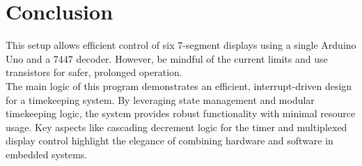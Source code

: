 \documentclass[journal]{IEEEtran}
\begin{document}
\section{Conclusion}
This setup allows efficient control of six 7-segment displays using a single Arduino Uno and a 7447 decoder. However, be mindful of the current limits and use transistors for safer, prolonged operation.\\
The main logic of this program demonstrates an efficient, interrupt-driven design for a timekeeping system. By leveraging state management and modular timekeeping logic, the system provides robust functionality with minimal resource usage. Key aspects like cascading decrement logic for the timer and multiplexed display control highlight the elegance of combining hardware and software in embedded systems.
\begin{figure}[h!]
    \centering
    \hfill
    \hfill
    \label{fig:main_fig}
\end{figure}
\end{document}
